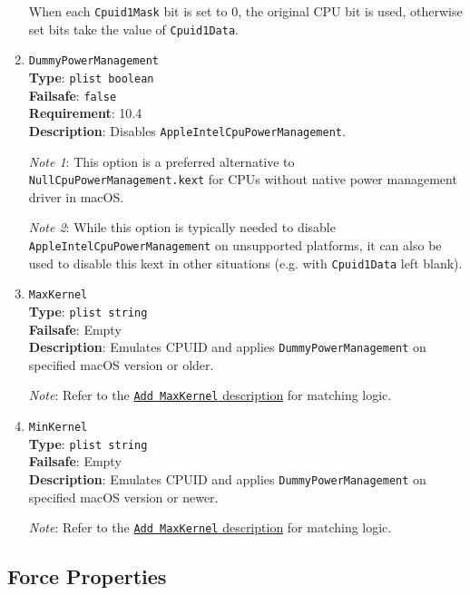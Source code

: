 \documentclass[]{article}
\begin{document}
\begin{enumerate}
  When each \texttt{Cpuid1Mask} bit is set to 0, the original CPU bit is used,
  otherwise set bits take the value of \texttt{Cpuid1Data}.

\item
  \texttt{DummyPowerManagement}\\
  \textbf{Type}: \texttt{plist\ boolean}\\
  \textbf{Failsafe}: \texttt{false}\\
  \textbf{Requirement}: 10.4\\
  \textbf{Description}: Disables \texttt{AppleIntelCpuPowerManagement}.

  \emph{Note 1}: This option is a preferred alternative to
  \texttt{NullCpuPowerManagement.kext} for CPUs without native power
  management driver in macOS.

  \emph{Note 2}: While this option is typically needed to disable \texttt{AppleIntelCpuPowerManagement}
  on unsupported platforms, it can also be used to disable this kext in other situations
  (e.g. with \texttt{Cpuid1Data} left blank).

\item
  \texttt{MaxKernel}\\
  \textbf{Type}: \texttt{plist\ string}\\
  \textbf{Failsafe}: Empty\\
  \textbf{Description}: Emulates CPUID and applies \texttt{DummyPowerManagement} on specified macOS version or older.

  \emph{Note}: Refer to the \hyperlink{kernmatch}{\texttt{Add\ MaxKernel} description} for matching logic.

\item
  \texttt{MinKernel}\\
  \textbf{Type}: \texttt{plist\ string}\\
  \textbf{Failsafe}: Empty\\
  \textbf{Description}: Emulates CPUID and applies \texttt{DummyPowerManagement} on specified macOS version or newer.

  \emph{Note}: Refer to the \hyperlink{kernmatch}{\texttt{Add\ MaxKernel} description} for matching logic.

\end{enumerate}

\subsection{Force Properties}\label{kernelpropsforce}
\end{document}
